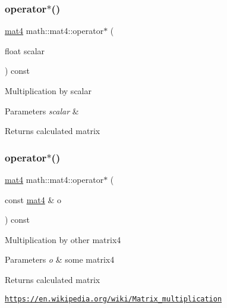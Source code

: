 \subsubsection{\texorpdfstring{operator$\ast$()}{operator*()}\hspace{0.1cm}{\footnotesize\ttfamily [1/2]}}
{\footnotesize\ttfamily \hyperlink{structmath_1_1mat4}{mat4} math\+::mat4\+::operator$\ast$ (\begin{DoxyParamCaption}\item[{float}]{scalar }\end{DoxyParamCaption}) const\hspace{0.3cm}{\ttfamily [inline]}}

Multiplication by scalar 
\begin{DoxyParams}{Parameters}
{\em scalar} & \\
\hline
\end{DoxyParams}
\begin{DoxyReturn}{Returns}
calculated matrix 
\end{DoxyReturn}
\mbox{\label{structmath_1_1mat4_a073575764764cf2eff9e3bc1f2740cf5}} 
\subsubsection{\texorpdfstring{operator$\ast$()}{operator*()}\hspace{0.1cm}{\footnotesize\ttfamily [2/2]}}
{\footnotesize\ttfamily \hyperlink{structmath_1_1mat4}{mat4} math\+::mat4\+::operator$\ast$ (\begin{DoxyParamCaption}\item[{const \hyperlink{structmath_1_1mat4}{mat4} \&}]{o }\end{DoxyParamCaption}) const\hspace{0.3cm}{\ttfamily [inline]}}

Multiplication by other matrix4 
\begin{DoxyParams}{Parameters}
{\em o} & some matrix4 \\
\hline
\end{DoxyParams}
\begin{DoxyReturn}{Returns}
calculated matrix
\end{DoxyReturn}
\href{https://en.wikipedia.org/wiki/Matrix_multiplication}{\tt https\+://en.\+wikipedia.\+org/wiki/\+Matrix\+\_\+multiplication} \mbox{\label{structmath_1_1mat4_a0dff7ff836daf55723f1c7b3c6e2a71f}} 
